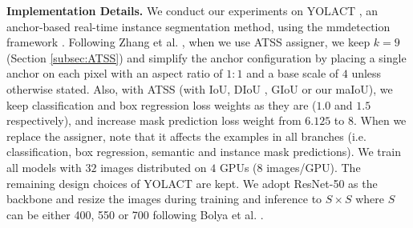 \documentclass{bmvc2k}
\begin{document}
\noindent \textbf{Implementation Details.} We conduct our experiments on YOLACT \cite{yolact}, an anchor-based real-time instance segmentation method, using the mmdetection framework \cite{mmdetection}. Following Zhang et al. \cite{ATSS}, when we use ATSS assigner, we keep $k=9$ (Section \ref{subsec:ATSS}) and simplify the anchor configuration by placing a single anchor on each pixel with an aspect ratio of $1:1$ and a base scale of $4$ unless otherwise stated. Also, with ATSS (with IoU, DIoU \cite{DIoULoss}, GIoU \cite{GIoULoss} or our  maIoU), we keep classification and box regression loss weights as they are ($1.0$ and $1.5$ respectively), and increase mask prediction loss weight from $6.125$ to $8$. When we replace the assigner, note that it affects the examples in all branches (i.e. classification, box regression, semantic and instance mask predictions). We train all models with $32$ images distributed on $4$ GPUs ($8$ images/GPU). The remaining design choices of YOLACT \cite{yolact} are kept. We adopt ResNet-50 \cite{ResNet} as the backbone and resize the images during training and inference to $S \times S$ where $S$ can be either 400, 550 or 700 following Bolya et al. \cite{yolact}.
\end{document}

